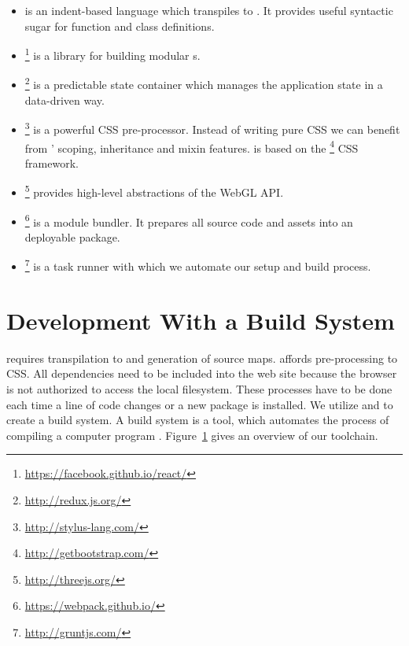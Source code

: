 \documentclass[../ClassicThesis.tex]{subfiles}
\begin{document}
\begin{itemize}
\item {\coffeescript} is an indent-based language which
  transpiles to {\javascript}. It provides useful syntactic
  sugar for function and class definitions.

\item
  \footnote{\url{https://facebook.github.io/react/}}
  is a {\javascript} library for building modular
  {\userinterface}s.

\item {}\footnote{\url{http://redux.js.org/}} is a
  predictable state container which manages the application
  state in a data-driven way.

\item {}\footnote{\url{http://stylus-lang.com/}}
  is a powerful CSS pre-processor. Instead of writing pure
  CSS we can benefit from ' scoping,
  inheritance and mixin features. {\platener} is based on
  the
  \footnote{\url{http://getbootstrap.com/}}
  CSS framework.

\item \name{\threejs}\footnote{\url{http://threejs.org/}}
  provides high-level abstractions of the WebGL API.

\item
  \footnote{\url{https://webpack.github.io/}}
  is a module bundler. It prepares all source code and
  assets into an deployable package.

\item {}\footnote{\url{http://gruntjs.com/}} is a
  {\javascript} task runner with which we automate our setup
  and build process.
\end{itemize}

\section{Development With a Build System}

{\coffeescript} requires transpilation to {\javascript} and
generation of source maps.  affords
pre-processing to CSS. All dependencies need to be included
into the web site because the browser is not authorized to
access the local filesystem. These processes have to be done
each time a line of code changes or a new package is
installed. We utilize  and  to
create a build system. A build system is a tool, which
automates the process of compiling a computer program
\cite{build-system}. Figure~\ref{} gives an overview of our
toolchain.
\end{document}
